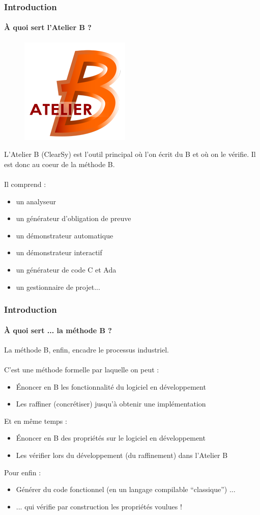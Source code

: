 \documentclass[11pt,a4paper,xcolor=table]{beamer} %
\begin{document}
\begin{frame}
\frametitle{Introduction}
\framesubtitle{À quoi sert l'Atelier B ?}
\begin{figure}[h]
\centering
\includegraphics[scale=0.2]{ressources/logo.png}
\end{figure}
\pause
L'Atelier B (ClearSy) est l'outil principal où l'on écrit du B et où on le vérifie. Il est donc au coeur de la méthode B.\\~\\
\pause
Il comprend :
\begin{itemize}
\item un analyseur
\pause
\item un générateur d'obligation de preuve
\pause
\item un démonstrateur automatique
\pause
\item un démonstrateur interactif
\pause
\item un générateur de code C et Ada
\pause
\item un gestionnaire de projet...
\end{itemize}
\end{frame}

\begin{frame}
\frametitle{Introduction}
\framesubtitle{À quoi sert ... la méthode B ?}
La méthode B, enfin, encadre le processus industriel.\\~\\ \pause
C'est une méthode formelle par laquelle on peut :\pause
\begin{itemize}
\item Énoncer en B les fonctionnalité du logiciel en développement
\pause
\item Les raffiner (concrétiser) jusqu'à obtenir une implémentation
\pause
\end{itemize}
Et en même temps :\pause
\begin{itemize}
\item Énoncer en B des propriétés sur le logiciel en développement
\pause
\item Les vérifier lors du développement (du raffinement) dans l'Atelier B
\pause
\end{itemize}
Pour enfin :
\begin{itemize}
\item Générer du code fonctionnel (en un langage compilable ``classique'') ...
\pause
\item ... qui vérifie par construction les propriétés voulues !
\end{itemize}
\end{frame}
\end{document}
